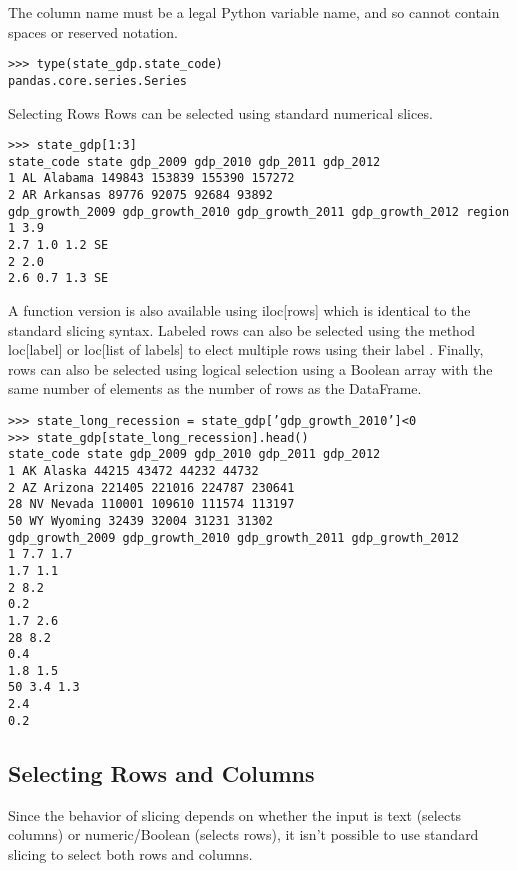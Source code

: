 \documentclass[KSmain.tex]{subfiles}
\begin{document}
The column name must be a legal Python variable name, and so cannot contain spaces or reserved notation.
\begin{framed}
\begin{verbatim}
>>> type(state_gdp.state_code)
pandas.core.series.Series
\end{verbatim}
\end{framed}
Selecting Rows
Rows can be selected using standard numerical slices.
\begin{framed}
\begin{verbatim}
>>> state_gdp[1:3]
state_code state gdp_2009 gdp_2010 gdp_2011 gdp_2012
1 AL Alabama 149843 153839 155390 157272
2 AR Arkansas 89776 92075 92684 93892
gdp_growth_2009 gdp_growth_2010 gdp_growth_2011 gdp_growth_2012 region
1 3.9
2.7 1.0 1.2 SE
2 2.0
2.6 0.7 1.3 SE
\end{verbatim}
\end{framed}
A function version is also available using iloc[rows] which is identical to the standard slicing syntax.
Labeled rows can also be selected using the method loc[label] or loc[list of labels] to elect multiple rows
using their label .
Finally, rows can also be selected using logical selection using a Boolean array with the same number
of elements as the number of rows as the DataFrame.
\begin{framed}
\begin{verbatim}
>>> state_long_recession = state_gdp[’gdp_growth_2010’]<0
>>> state_gdp[state_long_recession].head()
state_code state gdp_2009 gdp_2010 gdp_2011 gdp_2012
1 AK Alaska 44215 43472 44232 44732
2 AZ Arizona 221405 221016 224787 230641
28 NV Nevada 110001 109610 111574 113197
50 WY Wyoming 32439 32004 31231 31302
gdp_growth_2009 gdp_growth_2010 gdp_growth_2011 gdp_growth_2012
1 7.7 1.7
1.7 1.1
2 8.2
0.2
1.7 2.6
28 8.2
0.4
1.8 1.5
50 3.4 1.3
2.4
0.2
\end{verbatim}
\end{framed}
\subsection{Selecting Rows and Columns}
Since the behavior of slicing depends on whether the input is text (selects columns) or numeric/Boolean
(selects rows), it isn’t possible to use standard slicing to select both rows and columns. 
\end{document}
